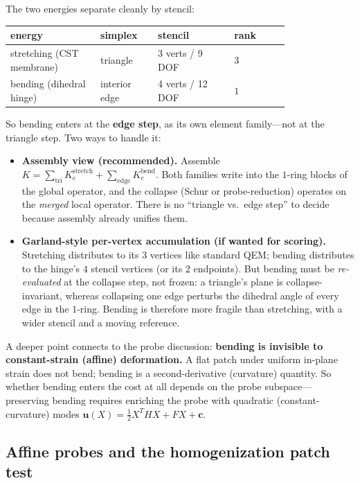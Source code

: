 The two energies separate cleanly by stencil:
\begin{center}
\renewcommand{\arraystretch}{1.3}
\begin{tabular}{|p{0.26\linewidth}|p{0.16\linewidth}|p{0.22\linewidth}|p{0.16\linewidth}|}
\hline
\textbf{energy} & \textbf{simplex} & \textbf{stencil} & \textbf{rank} \\
\hline
stretching (CST membrane) & triangle & 3 verts / 9 DOF & $3$ \\
\hline
bending (dihedral hinge) & interior edge & 4 verts / 12 DOF & $1$ \\
\hline
\end{tabular}
\end{center}
\noindent So bending enters at the \textbf{edge step}, as its own element family---not at the triangle step.
Two ways to handle it:
\begin{itemize}
  \item \textbf{Assembly view (recommended).}
        Assemble $K = \sum_{\text{tri}} K_e^{\text{stretch}} + \sum_{\text{edge}} K_e^{\text{bend}}$.
        Both families write into the $1$-ring blocks of the global operator, and the collapse (Schur or probe-reduction) operates on the \emph{merged} local operator.
        There is no ``triangle vs.\ edge step'' to decide because assembly already unifies them.
  \item \textbf{Garland-style per-vertex accumulation (if wanted for scoring).}
        Stretching distributes to its $3$ vertices like standard QEM; bending distributes to the hinge's $4$ stencil vertices (or its $2$ endpoints).
        But bending must be \emph{re-evaluated} at the collapse step, not frozen: a triangle's plane is collapse-invariant, whereas collapsing one edge perturbs the dihedral angle of every edge in the $1$-ring.
        Bending is therefore more fragile than stretching, with a wider stencil and a moving reference.
\end{itemize}
A deeper point connects to the probe discussion: \textbf{bending is invisible to constant-strain (affine) deformation.}
A flat patch under uniform in-plane strain does not bend; bending is a second-derivative (curvature) quantity.
So whether bending enters the cost at all depends on the probe subspace---preserving bending requires enriching the probe with quadratic (constant-curvature) modes $\mathbf{u}(X)=\tfrac12 X^T H X + FX + \mathbf{c}$.

\subsection{Affine probes and the homogenization patch test}

